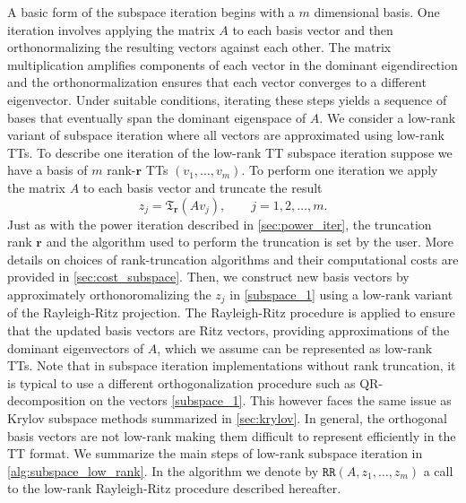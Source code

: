 \documentclass[10pt,preprint]{elsarticle}
\def\r{\bm r}
\begin{document}
A basic form of the subspace iteration begins with a $m$ dimensional basis. One iteration involves applying the matrix $A$ to each basis vector and then orthonormalizing the resulting vectors against each other. The matrix multiplication amplifies components of each vector in the dominant eigendirection and the orthonormalization ensures that each vector converges to a different eigenvector. Under suitable conditions, iterating these steps yields a sequence of bases that eventually span the dominant eigenspace of $A$. 
%
We consider a low-rank variant of subspace iteration where all vectors are approximated using low-rank TTs. To describe one iteration of the low-rank TT subspace iteration suppose we have a basis of $m$ rank-$\r$ TTs $(v_1,\ldots,v_m)$. To perform one iteration we apply the matrix $A$ to each basis vector and truncate the result 
\begin{equation}
\label{subspace_1}
z_j = \mathfrak{T}_{\bm r}\left( A v_j \right), \qquad j = 1,2,\ldots,m. 
\end{equation}
Just as with the power iteration described in \cref{sec:power_iter}, the truncation rank $\bm r$ and the algorithm used to perform the truncation is set by the user. More details on choices of rank-truncation algorithms and their computational costs are provided in \cref{sec:cost_subspace}. 
%
Then, we construct new basis vectors by approximately orthonoromalizing the $z_j$ in \eqref{subspace_1} using a low-rank variant of the Rayleigh-Ritz projection. 
The Rayleigh-Ritz procedure is applied to ensure that the updated basis vectors are Ritz vectors, providing approximations of the dominant eigenvectors of $A$, which we assume can be represented as low-rank TTs. Note that in subspace iteration implementations without rank truncation, it is typical to use a different orthogonalization procedure such as QR-decomposition on the vectors \eqref{subspace_1}. This however faces the same issue as Krylov subspace methods summarized in \cref{sec:krylov}. In general, the orthogonal basis vectors are not low-rank making them difficult to represent efficiently in the TT format. We summarize the main steps of low-rank subspace iteration in \cref{alg:subspace_low_rank}. In the algorithm we denote by $\texttt{RR}(A,z_1,\ldots,z_m)$ a call to the low-rank Rayleigh-Ritz procedure described hereafter. 
\end{document}
